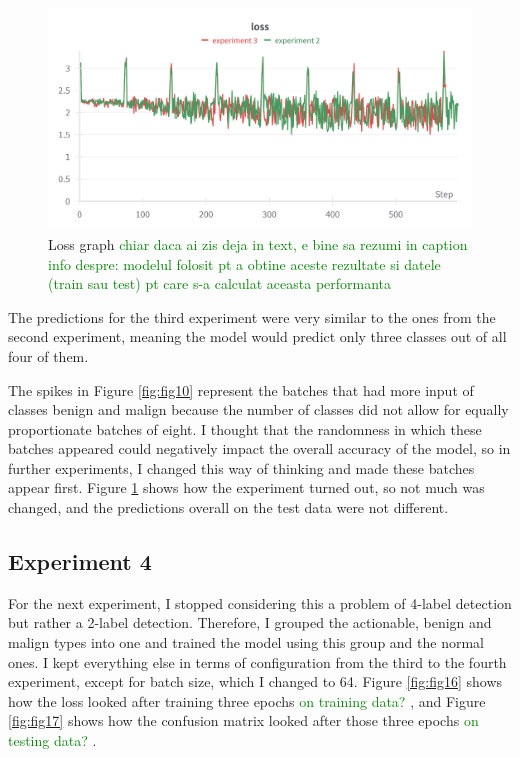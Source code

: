 \begin{figure}[!ht]
    \centering
    \includegraphics[width=1\textwidth]{figures/Figure14.png}
    \caption{Loss graph
    \textcolor{green}{chiar daca ai zis deja in text, e bine sa rezumi in caption info despre: modelul folosit pt a obtine aceste rezultate si datele (train sau test) pt care s-a calculat aceasta performanta}
    }
    \label{fig:fig13}
\end{figure}

The predictions for the third experiment were very similar to the ones from the second experiment, meaning the model would predict only three classes out of all four of them.

The spikes in Figure \ref{fig:fig10} represent the batches that had more input of classes benign and malign because the number of classes did not allow for equally proportionate batches of eight. I thought that the randomness in which these batches appeared could negatively impact the overall accuracy of the model, so in further experiments, I changed this way of thinking and made these batches appear first. Figure \ref{fig:fig13} shows how the experiment turned out, so not much was changed, and the predictions overall on the test data were not different.

\subsection{Experiment 4}

For the next experiment, I stopped considering this a problem of 4-label detection but rather a 2-label detection. Therefore, I grouped the actionable, benign and malign types into one and trained the model using this group and the normal ones. I kept everything else in terms of configuration from the third to the fourth experiment, except for batch size, which I changed to 64. Figure \ref{fig:fig16} shows how the loss looked after training three epochs
\textcolor{green}{on training data?} 
, and Figure \ref{fig:fig17} shows how the confusion matrix looked after those three epochs
\textcolor{green}{on testing data?}
.

